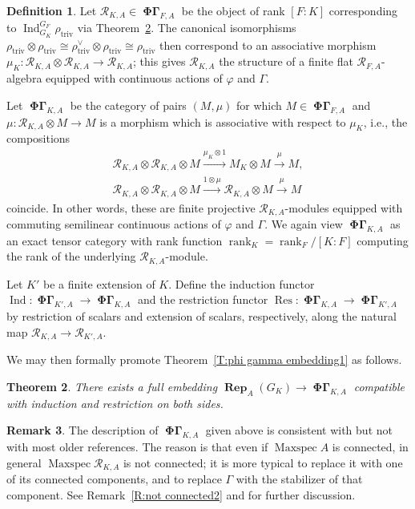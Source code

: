 \documentclass[12pt]{amsart}
\newtheorem{theorem}{Theorem}[section]
\theoremstyle{definition}
\newtheorem{defn}[theorem]{Definition}
\newtheorem{remark}[theorem]{Remark}
\numberwithin{equation}{theorem}
\newcommand{\calR}{\mathcal{R}}
\newcommand{\dual}{\vee}
\DeclareMathOperator{\Ind}{Ind}
\DeclareMathOperator{\Maxspec}{Maxspec}
\DeclareMathOperator{\PhiGamma}{\mathbf{\Phi \Gamma}}
\DeclareMathOperator{\rank}{rank}
\DeclareMathOperator{\Rep}{\mathbf{Rep}}
\DeclareMathOperator{\Res}{Res}
\DeclareMathOperator{\triv}{triv}
\begin{document}
\begin{defn}
Let $\calR_{K,A} \in \PhiGamma_{F,A}$ be the object of rank $[F:K]$ corresponding to $\Ind^{G_F}_{G_K} \rho_{\triv}$ via Theorem~\ref{T:phi gamma embedding}. The canonical isomorphisms $\rho_{\triv} \otimes \rho_{\triv} \cong \rho_{\triv}^\dual \otimes \rho_{\triv} \cong \rho_{\triv}$
then correspond to an associative morphism $\mu_K: \calR_{K,A} \otimes \calR_{K,A} \to \calR_{K,A}$; this gives $\calR_{K,A}$ the structure of a finite flat $\calR_{F,A}$-algebra equipped with continuous actions of $\varphi$ and $\Gamma$.

Let $\PhiGamma_{K,A}$ be the category of pairs $(M, \mu)$ for which $M \in \PhiGamma_{F,A}$
and $\mu: \calR_{K,A} \otimes M \to M$ is a morphism which is associative with respect to $\mu_K$, i.e., the compositions
\begin{gather*}
\calR_{K,A} \otimes \calR_{K,A}  \otimes M \stackrel{\mu_K \otimes 1}{\to} M_K \otimes M \stackrel{\mu}{\to} M, \\
\calR_{K,A} \otimes \calR_{K,A} \otimes M \stackrel{1 \otimes \mu}{\to} \calR_{K,A} \otimes  M \stackrel{\mu}{\to} M
\end{gather*}
coincide. 
In other words, these are finite projective $\calR_{K,A}$-modules equipped with commuting semilinear continuous actions of $\varphi$ and $\Gamma$.
We again view $\PhiGamma_{K,A}$ as an exact tensor category with rank function $\rank_K = \rank_F / [K:F]$ computing the rank of the underlying $\calR_{K,A}$-module.

Let $K'$ be a finite extension of $K$. Define the induction functor
$\Ind: \PhiGamma_{K',A} \to \PhiGamma_{K,A}$ 
and the restriction functor $\Res: \PhiGamma_{K,A} \to \PhiGamma_{K',A}$
by restriction of scalars and extension of scalars, respectively, along the natural map $\calR_{K,A}  \to \calR_{K',A}$.
\end{defn}

We may then formally promote Theorem~\ref{T:phi gamma embedding1} as follows.
\begin{theorem} \label{T:phi gamma embedding}
There exists a full embedding $\Rep_A(G_K) \to \PhiGamma_{K,A}$ compatible with induction and restriction on both sides.
\end{theorem}

\begin{remark} \label{R:not connected}
The description of $\PhiGamma_{K,A}$ given above is consistent with \cite{kedlaya-new-phigamma} but not with most older references. The reason is that even if $\Maxspec A$ is connected, in general $\Maxspec \calR_{K,A}$ is not connected; it is more typical to replace it with one of its connected components, and to replace $\Gamma$ with the stabilizer of that component.
See Remark~\ref{R:not connected2} and \cite[Remark~2.2.12]{kedlaya-new-phigamma} for further discussion.
\end{remark}
\end{document}
